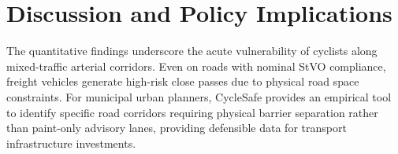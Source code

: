 \section{Discussion and Policy Implications}
The quantitative findings underscore the acute vulnerability of cyclists along mixed-traffic arterial corridors. Even on roads with nominal StVO compliance, freight vehicles generate high-risk close passes due to physical road space constraints. For municipal urban planners, CycleSafe provides an empirical tool to identify specific road corridors requiring physical barrier separation rather than paint-only advisory lanes, providing defensible data for transport infrastructure investments.
